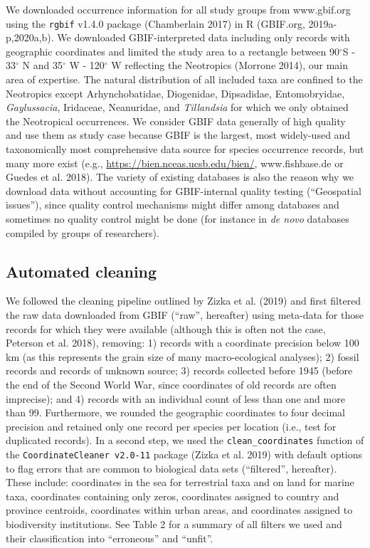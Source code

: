 \documentclass[fleqn,10pt,lineno]{wlpeerj} %
\begin{document}
We downloaded occurrence information for all study groups from www.gbif.org using the \texttt{rgbif} v1.4.0 package (Chamberlain 2017) in R (GBIF.org, 2019a-p,2020a,b). We downloaded GBIF-interpreted data including only records with geographic coordinates and limited the study area to a rectangle between 90\(^\circ\)S - 33\(^\circ\) N and 35\(^\circ\) W - 120\(^\circ\) W reflecting the Neotropics (Morrone 2014), our main area of expertise. The natural distribution of all included taxa are confined to the Neotropics except Arhynchobatidae, Diogenidae, Dipsadidae, Entomobryidae, \emph{Gaylussacia}, Iridaceae, Neanuridae, and \emph{Tillandsia} for which we only obtained the Neotropical occurrences. We consider GBIF data generally of high quality and use them as study case because GBIF is the largest, most widely-used and taxonomically most comprehensive data source for species occurrence records, but many more exist (e.g., \url{https://bien.nceas.ucsb.edu/bien/}, www.fishbase.de or Guedes et al. 2018). The variety of existing databases is also the reason why we download data without accounting for GBIF-internal quality testing (``Geospatial issues''), since quality control mechanisms might differ among databases and sometimes no quality control might be done (for instance in \emph{de novo} databases compiled by groups of researchers).

\hypertarget{automated-cleaning}{%
\subsection*{Automated cleaning}\label{automated-cleaning}}

We followed the cleaning pipeline outlined by Zizka et al. (2019) and first filtered the raw data downloaded from GBIF (``raw'', hereafter) using meta-data for those records for which they were available (although this is often not the case, Peterson et al. 2018), removing: 1) records with a coordinate precision below 100 km (as this represents the grain size of many macro-ecological analyses); 2) fossil records and records of unknown source; 3) records collected before 1945 (before the end of the Second World War, since coordinates of old records are often imprecise); and 4) records with an individual count of less than one and more than 99. Furthermore, we rounded the geographic coordinates to four decimal precision and retained only one record per species per location (i.e., test for duplicated records). In a second step, we used the \texttt{clean\_coordinates} function of the \texttt{CoordinateCleaner\ v2.0-11} package (Zizka et al. 2019) with default options to flag errors that are common to biological data sets (``filtered'', hereafter). These include: coordinates in the sea for terrestrial taxa and on land for marine taxa, coordinates containing only zeros, coordinates assigned to country and province centroids, coordinates within urban areas, and coordinates assigned to biodiversity institutions. See Table 2 for a summary of all filters we used and their classification into ``erroneous'' and ``unfit''.
\end{document}
